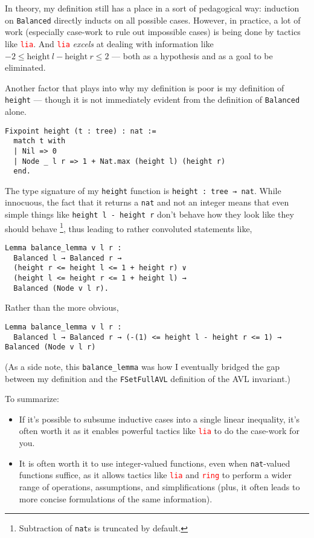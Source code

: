 \documentclass[acmsmall, authorversion, nonacm, overload]{acmart}
\begin{document}
In theory, my definition still has a place in a sort of pedagogical way:
induction on \verb|Balanced| directly inducts on all possible cases.
However, in practice, a lot of work (especially case-work to rule out impossible cases)
is being done by tactics like \texttt{\textcolor{red}{lia}}.
And \texttt{\textcolor{red}{lia}} \emph{excels} at dealing with
information like $-2 \le \mathrm{height}\ l - \mathrm{height}\ r \le 2$ ---
both as a hypothesis and as a goal to be eliminated.

\vspace{1em}
\noindent Another factor that plays into why my definition is poor is
my definition of \verb|height| --- though it is not immediately evident from the definition of \verb|Balanced|
alone.
\begin{verbatim}
Fixpoint height (t : tree) : nat :=
  match t with
  | Nil => 0
  | Node _ l r => 1 + Nat.max (height l) (height r)
  end.
\end{verbatim}
The type signature of my \verb|height| function is \verb|height : tree → nat|.
While innocuous, the fact that it returns a \verb|nat| and not an integer
means that even simple things like \verb|height l - height r|
don't behave how they look like they should behave
\footnote{Subtraction of \texttt{nat}s is truncated by default.},
thus leading to rather convoluted statements like,
\begin{verbatim}
Lemma balance_lemma v l r :
  Balanced l → Balanced r →
  (height r <= height l <= 1 + height r) ∨
  (height l <= height r <= 1 + height l) →
  Balanced (Node v l r).
\end{verbatim}
Rather than the more obvious,
\begin{verbatim}
Lemma balance_lemma v l r :
  Balanced l → Balanced r → (-(1) <= height l - height r <= 1) → Balanced (Node v l r)
\end{verbatim}
(As a side note, this \verb|balance_lemma| was how I eventually bridged the gap between
my definition and the \verb|FSetFullAVL| definition of the AVL invariant.)

\vspace{1em}
\noindent To summarize:
\begin{itemize}
\item If it's possible to subsume inductive cases into a single linear inequality,
  it's often worth it as it enables powerful tactics like \texttt{\textcolor{red}{lia}}
  to do the case-work for you.
\item It is often worth it to use integer-valued functions, even when \verb|nat|-valued functions suffice,
  as it allows tactics like \texttt{\textcolor{red}{lia}} and \texttt{\textcolor{red}{ring}}
  to perform a wider range of operations, assumptions, and simplifications
  (plus, it often leads to more concise formulations of the same information).
\end{itemize}
\end{document}
